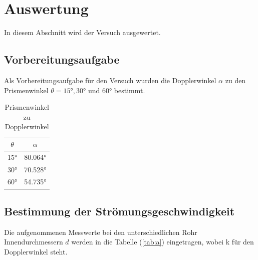 \newpage
\section{Auswertung}

In diesem Abschnitt wird der Versuch ausgewertet.

\subsection{Vorbereitungsaufgabe}
Als Vorbereitungsaufgabe für den Versuch wurden die Dopplerwinkel $\alpha$ zu den Prismenwinkel $\theta = 15° , 30°$ und $60°$ bestimmt.

\begin{table}
    \centering
    \caption{Prismenwinkel zu Dopplerwinkel}
    \begin{tabular}{c c}
        \toprule
        {$\theta$} & {$\alpha$}  \\
        \midrule
        15° & 80.064°  \\
        30° & 70.528°  \\
        60° & 54.735°  \\
        \bottomrule
    \end{tabular}
    \label{tab:vor}
\end{table}

\subsection{Bestimmung der Strömungsgeschwindigkeit}

Die aufgenommenen Messwerte bei den unterschiedlichen Rohr Innendurchmessern $d$ werden in die Tabelle (\ref{tab:a}) eingetragen, wobei k für den Dopplerwinkel steht.

